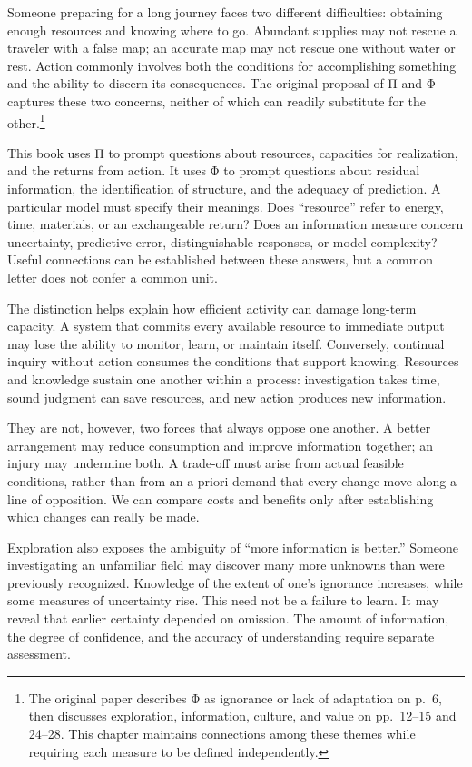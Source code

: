 \documentclass[
  english,
  11pt,
  oneside]{book}
\begin{document}
Someone preparing for a long journey faces two different difficulties: obtaining enough resources and knowing where to go. Abundant supplies may not rescue a traveler with a false map; an accurate map may not rescue one without water or rest. Action commonly involves both the conditions for accomplishing something and the ability to discern its consequences. The original proposal of Π and Φ captures these two concerns, neither of which can readily substitute for the other.\footnote{\hypertarget{ph-note-34}{}The original paper describes Φ as ignorance or lack of adaptation on p.~6, then discusses exploration, information, culture, and value on pp.~12--15 and 24--28. This chapter maintains connections among these themes while requiring each measure to be defined independently.}

This book uses Π to prompt questions about resources, capacities for realization, and the returns from action. It uses Φ to prompt questions about residual information, the identification of structure, and the adequacy of prediction. A particular model must specify their meanings. Does ``resource'' refer to energy, time, materials, or an exchangeable return? Does an information measure concern uncertainty, predictive error, distinguishable responses, or model complexity? Useful connections can be established between these answers, but a common letter does not confer a common unit.

The distinction helps explain how efficient activity can damage long-term capacity. A system that commits every available resource to immediate output may lose the ability to monitor, learn, or maintain itself. Conversely, continual inquiry without action consumes the conditions that support knowing. Resources and knowledge sustain one another within a process: investigation takes time, sound judgment can save resources, and new action produces new information.

They are not, however, two forces that always oppose one another. A better arrangement may reduce consumption and improve information together; an injury may undermine both. A trade-off must arise from actual feasible conditions, rather than from an a priori demand that every change move along a line of opposition. We can compare costs and benefits only after establishing which changes can really be made.

Exploration also exposes the ambiguity of ``more information is better.'' Someone investigating an unfamiliar field may discover many more unknowns than were previously recognized. Knowledge of the extent of one's ignorance increases, while some measures of uncertainty rise. This need not be a failure to learn. It may reveal that earlier certainty depended on omission. The amount of information, the degree of confidence, and the accuracy of understanding require separate assessment.
\end{document}
